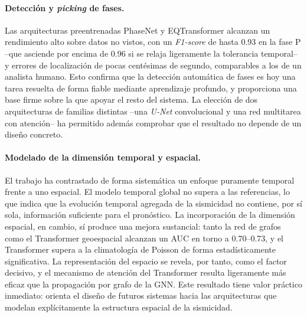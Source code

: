 \paragraph{Detección y \textit{picking} de fases.} Las arquitecturas preentrenadas PhaseNet y
EQTransformer alcanzan un rendimiento alto sobre datos no vistos, con un \textit{F1-score} de
hasta 0.93 en la fase P --que asciende por encima de 0.96 si se relaja ligeramente la
tolerancia temporal-- y errores de localización de pocas centésimas de segundo, comparables a
los de un analista humano. Esto confirma que la detección automática de fases es hoy una tarea
resuelta de forma fiable mediante aprendizaje profundo, y proporciona una base firme sobre la
que apoyar el resto del sistema. La elección de dos arquitecturas de familias distintas --una
\textit{U-Net} convolucional y una red multitarea con atención-- ha permitido además comprobar
que el resultado no depende de un diseño concreto.

\paragraph{Modelado de la dimensión temporal y espacial.} El trabajo ha contrastado de forma
sistemática un enfoque puramente temporal frente a uno espacial. El modelo temporal global no
supera a las referencias, lo que indica que la evolución temporal agregada de la sismicidad no
contiene, por sí sola, información suficiente para el pronóstico. La incorporación de la
dimensión espacial, en cambio, sí produce una mejora sustancial: tanto la red de grafos como el
Transformer geoespacial alcanzan un AUC en torno a 0.70--0.73, y el Transformer supera a la
climatología de Poisson de forma estadísticamente significativa. La representación del espacio
se revela, por tanto, como el factor decisivo, y el mecanismo de atención del Transformer
resulta ligeramente más eficaz que la propagación por grafo de la GNN. Este resultado tiene
valor práctico inmediato: orienta el diseño de futuros sistemas hacia las arquitecturas que
modelan explícitamente la estructura espacial de la sismicidad.

